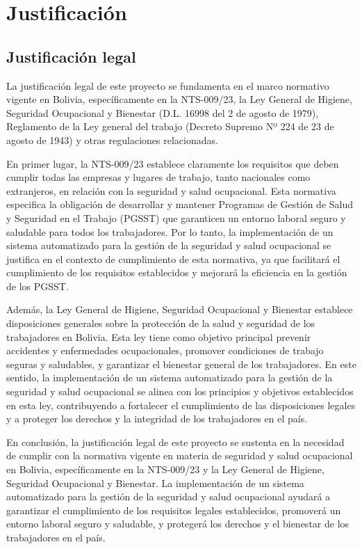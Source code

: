 \section{Justificación}
\subsection{Justificación legal}
La justificación legal de este proyecto se fundamenta en el marco normativo vigente en Bolivia, específicamente en la NTS-009/23, la Ley General de Higiene, Seguridad Ocupacional y Bienestar (D.L. 16998 del 2 de agosto de 1979), Reglamento de la Ley general del trabajo (Decreto Supremo Nº 224 de 23 de agosto de 1943) y otras regulaciones relacionadas.

En primer lugar, la NTS-009/23 establece claramente los requisitos que deben cumplir todas las empresas y lugares de trabajo, tanto nacionales como extranjeros, en relación con la seguridad y salud ocupacional. Esta normativa especifica la obligación de desarrollar y mantener Programas de Gestión de Salud y Seguridad en el Trabajo (PGSST) que garanticen un entorno laboral seguro y saludable para todos los trabajadores. Por lo tanto, la implementación de un sistema automatizado para la gestión de la seguridad y salud ocupacional se justifica en el contexto de cumplimiento de esta normativa, ya que facilitará el cumplimiento de los requisitos establecidos y mejorará la eficiencia en la gestión de los PGSST.

Además, la Ley General de Higiene, Seguridad Ocupacional y Bienestar establece disposiciones generales sobre la protección de la salud y seguridad de los trabajadores en Bolivia. Esta ley tiene como objetivo principal prevenir accidentes y enfermedades ocupacionales, promover condiciones de trabajo seguras y saludables, y garantizar el bienestar general de los trabajadores. En este sentido, la implementación de un sistema automatizado para la gestión de la seguridad y salud ocupacional se alinea con los principios y objetivos establecidos en esta ley, contribuyendo a fortalecer el cumplimiento de las disposiciones legales y a proteger los derechos y la integridad de los trabajadores en el país.

En conclusión, la justificación legal de este proyecto se sustenta en la necesidad de cumplir con la normativa vigente en materia de seguridad y salud ocupacional en Bolivia, específicamente en la NTS-009/23 y la Ley General de Higiene, Seguridad Ocupacional y Bienestar. La implementación de un sistema automatizado para la gestión de la seguridad y salud ocupacional ayudará a garantizar el cumplimiento de los requisitos legales establecidos, promoverá un entorno laboral seguro y saludable, y protegerá los derechos y el bienestar de los trabajadores en el país.

